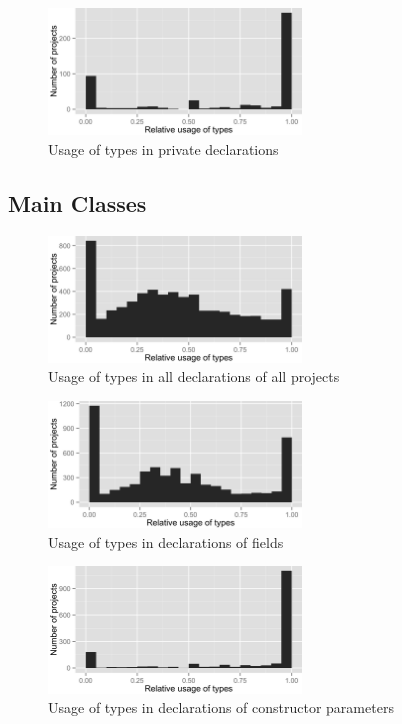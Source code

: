 \begin{figure}[h]
\centering 
\includegraphics[width=0.6\textwidth]{../aosd_2014/analysis/result/test/test/histograms/11_Private.png} 
\caption{Usage of types in private declarations}
\end{figure}

\FloatBarrier
\subsection*{Main Classes}

\begin{figure}[h]
\centering 
\includegraphics[width=0.6\textwidth]{../aosd_2014/analysis/result/test/main/histograms/5_all.png} 
\caption{Usage of types in all declarations of all projects}
\end{figure}

\begin{figure}[h]
\centering 
\includegraphics[width=0.6\textwidth]{../aosd_2014/analysis/result/test/main/histograms/10_Field.png} 
\caption{Usage of types in declarations of fields}
\end{figure}

\begin{figure}[h]
\centering 
\includegraphics[width=0.6\textwidth]{../aosd_2014/analysis/result/test/main/histograms/9_Constructor_Parameter.png} 
\caption{Usage of types in declarations of constructor parameters}
\end{figure}

